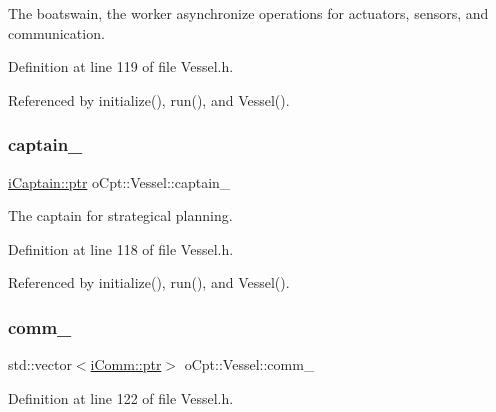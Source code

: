 The boatswain, the worker asynchronize operations for actuators, sensors, and communication. 



Definition at line 119 of file Vessel.\+h.



Referenced by initialize(), run(), and Vessel().

\hypertarget{classo_cpt_1_1_vessel_ae135ec01edc448d7973726a78d2a677a}{}\label{classo_cpt_1_1_vessel_ae135ec01edc448d7973726a78d2a677a} 
\subsubsection{\texorpdfstring{captain\+\_\+}{captain\_}}
{\footnotesize\ttfamily \hyperlink{classo_cpt_1_1i_captain_ae1595d808fa14777c26f1227a82ac4f5}{i\+Captain\+::ptr} o\+Cpt\+::\+Vessel\+::captain\+\_\+\hspace{0.3cm}{\ttfamily [protected]}}



The captain for strategical planning. 



Definition at line 118 of file Vessel.\+h.



Referenced by initialize(), run(), and Vessel().

\hypertarget{classo_cpt_1_1_vessel_a0f09f5d34963356faa3834b379e8081e}{}\label{classo_cpt_1_1_vessel_a0f09f5d34963356faa3834b379e8081e} 
\subsubsection{\texorpdfstring{comm\+\_\+}{comm\_}}
{\footnotesize\ttfamily std\+::vector$<$\hyperlink{classo_cpt_1_1i_comm_af0c655f143251b7d03fcd98f89637228}{i\+Comm\+::ptr}$>$ o\+Cpt\+::\+Vessel\+::comm\+\_\+\hspace{0.3cm}{\ttfamily [protected]}}



Definition at line 122 of file Vessel.\+h.

\hypertarget{classo_cpt_1_1_vessel_a5416b2e16fd2457921fb6c15b45998e0}{}\label{classo_cpt_1_1_vessel_a5416b2e16fd2457921fb6c15b45998e0} 
